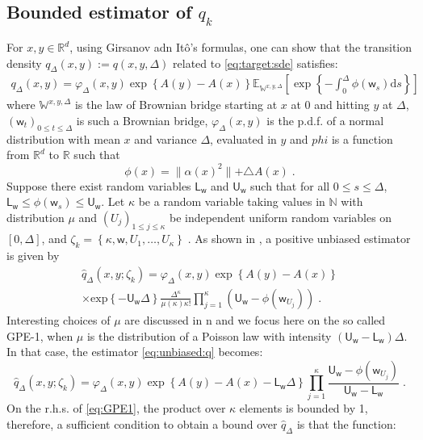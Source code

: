 \documentclass[12pt,draft]{article}
\newcommand{\rmd}{\mathrm{d}}
\newcommand{\eqsp}{\;}
\newcommand{\1}{\mathrm{1}}
\newcommand{\mw}{\mathsf{w}}%
\newcommand{\U}{\mathsf{U}}
\newcommand{\Lo}{\mathsf{L}}
\begin{document}
\subsection*{Bounded estimator of $q_k$}
For $x, y \in \mathbb{R}^d$, using Girsanov adn Itô's formulas, one can show that the transition density $q_\Delta(x,y):=q(x,y,\Delta)$ related to \eqref{eq:target:sde} satisfies:
\begin{align*}
q_\Delta(x,y)=\varphi_\Delta(x,y)\exp\left\lbrace A(y)-A(x)\right\rbrace \mathbb{E}_{\mathbb{W}^{x,y,\Delta}}\left[ \exp \left\lbrace - \int_0^\Delta \phi(\mw_s)\rmd s \right\rbrace \right]
\end{align*}
where $\mathbb{W}^{x,y,\Delta}$ is the law of Brownian bridge starting at $x$ at 0 and hitting $y$ at $\Delta$, $(\mw_t)_{0\leq t \leq \Delta}$ is such a Brownian bridge, $\varphi_\Delta(x,y)$ is the p.d.f. of a normal distribution with mean $x$ and variance $\Delta$, evaluated in $y$ and $phi$ is a function from $\mathbb{R}^d$ to $\mathbb{R}$ such that
\[
\phi(x) =\parallel \alpha(x)^2 \parallel + \triangle A(x)\eqsp.
\]
Suppose there exist random variables $\Lo_\mw$ and $\U_\mw$ such that for all $0\leq s \leq \Delta$, $\Lo_\mw \leq \phi(\mw_s)\leq \U_\mw$.
Let $\kappa$ be a random variable taking values in $\mathbb{N}$ with distribution $\mu$ and $(U_j)_{1\le j\le \kappa}$ be independent uniform random variables on $[0,\Delta]$, and $
\zeta_k = \left\{\kappa,\mw,U_1,\ldots,U_\kappa\right\}\eqsp$. 
As shown in \cite{fearnhead:papaspiliopoulos:roberts:2008}, a positive unbiased estimator is given by 
\begin{multline}
\widehat{q}_\Delta(x,y;\zeta_k) = \varphi_\Delta(x,y) \exp \left\{A(y) - A(x)\right\}\\ 
\times\mathrm{exp}\left\{-\U_\mw\Delta\right\}\frac{\Delta^{\kappa}}{\mu(\kappa)\kappa!}\prod_{j=1}^{\kappa}\left(\U_\mw-\phi(\mw_{U_j})\right)\eqsp.\label{eq:unbiased:q}
\end{multline}
Interesting choices of $\mu$ are discussed in \cite{fearnhead:papaspiliopoulos:roberts:2008}n and we focus here on the so called GPE-1, when $\mu$ is the distribution of a Poisson law with intensity $(\U_\mw-\Lo_\mw)\Delta$. In that case, the estimator \eqref{eq:unbiased:q} becomes:
\begin{equation}
\widehat{q}_\Delta(x,y;\zeta_k) = \varphi_\Delta(x,y) \exp \left\{A(y) - A(x)- \Lo_\mw\Delta \right\}\prod_{j=1}^{\kappa}\frac{\U_\mw-\phi(\mw_{U_j})}{\U_\mw-\Lo_\mw}\eqsp.\label{eq:GPE1}
\end{equation}
On the r.h.s. of \eqref{eq:GPE1}, the product over $\kappa$ elements is bounded by 1, therefore, a sufficient condition to obtain a bound over $\hat{q}_\Delta$ is that the function:
\end{document}

